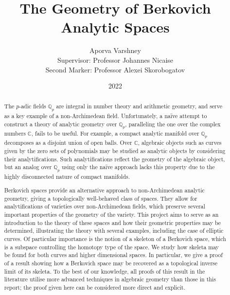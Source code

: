 \documentclass[10pt, a4paper]{report}
\title{The Geometry of Berkovich Analytic Spaces}
\author{Aporva Varshney \\ Supervisor: Professor Johannes Nicaise \\ Second Marker: Professor Alexei Skorobogatov}
\date{2022}
\begin{document}
\maketitle

\begin{abstract}
    The $p$-adic fields $\mathbb{Q}_p$ are integral in number theory and arithmetic geometry, and serve as a key example of a non-Archimedean field.
    Unfortunately, a na{\"i}ve attempt to construct a theory of analytic geometry over $\mathbb{Q}_p$, paralleling the one over the complex numbers $\mathbb{C}$, fails to be useful. 
    For example, a compact analytic manifold over $\mathbb{Q}_p$ decomposes as a disjoint union of open balls.
    Over $\mathbb{C}$, algebraic objects such as curves given by the zero sets of polynomials may be studied as analytic objects by considering their analytifications.
    Such analytifications reflect the geometry of the algebraic object, but an analog over $\mathbb{Q}_p$ using only the na{\"i}ve approach lacks this property due to the highly disconnected nature of compact manifolds.
    
    Berkovich spaces provide an alternative approach to non-Archimedean analytic geometry, giving a topologically well-behaved class of spaces.
    They allow for analytifications of varieties over non-Archimedean fields, which preserve several important properties of the geometry of the variety.
    This project aims to serve as an introduction to the theory of these spaces and how their geometric properties may be determined, illustrating the theory with several examples, including the case of elliptic curves.
    Of particular importance is the notion of a skeleton of a Berkovich space, which is a subspace controlling the homotopy type of the space.
    We study how skeleta may be found for both curves and higher dimensional spaces. 
    In particular, we give a proof of a result showing how a Berkovich space may be recovered as a topological inverse limit of its skeleta.
    To the best of our knowledge, all proofs of this result in the literature utilise more advanced techniques in algebraic geometry than those in this report; the proof given here can be considered more direct and explicit.
\end{abstract}

\tableofcontents













\printbibliography
\end{document}
